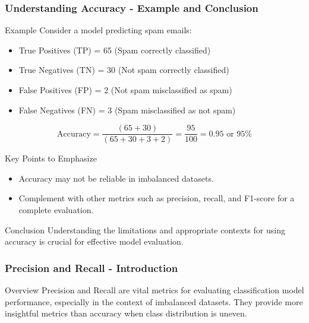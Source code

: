 \documentclass[aspectratio=169]{beamer}
\begin{document}
\begin{frame}[fragile]
    \frametitle{Understanding Accuracy - Example and Conclusion}
    \begin{block}{Example}
        Consider a model predicting spam emails:
        \begin{itemize}
            \item True Positives (TP) = 65 (Spam correctly classified)
            \item True Negatives (TN) = 30 (Not spam correctly classified)
            \item False Positives (FP) = 2 (Not spam misclassified as spam)
            \item False Negatives (FN) = 3 (Spam misclassified as not spam)
        \end{itemize}
        \begin{equation}
            \text{Accuracy} = \frac{(65 + 30)}{(65 + 30 + 3 + 2)} = \frac{95}{100} = 0.95 \text{ or } 95\%
        \end{equation}
    \end{block}

    \begin{block}{Key Points to Emphasize}
        \begin{itemize}
            \item Accuracy may not be reliable in imbalanced datasets.
            \item Complement with other metrics such as precision, recall, and F1-score for a complete evaluation.
        \end{itemize}
    \end{block}
    
    \begin{block}{Conclusion}
        Understanding the limitations and appropriate contexts for using accuracy is crucial for effective model evaluation.
    \end{block}
\end{frame}

\begin{frame}[fragile]
    \frametitle{Precision and Recall - Introduction}
    \begin{block}{Overview}
        Precision and Recall are vital metrics for evaluating classification model performance, especially in the context of imbalanced datasets. They provide more insightful metrics than accuracy when class distribution is uneven.
    \end{block}
\end{frame}
\end{document}
